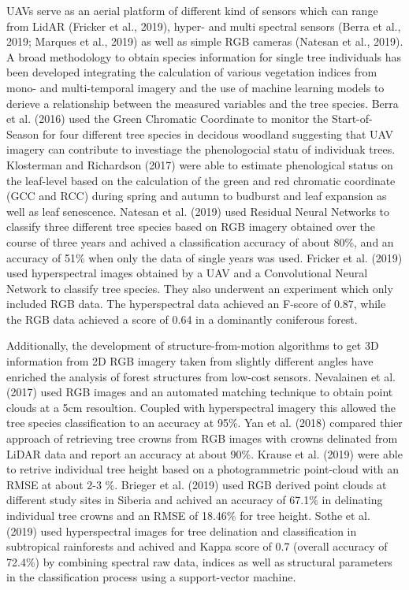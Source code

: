 \documentclass[]{article}
\begin{document}
UAVs serve as an aerial platform of different kind of sensors which can
range from LidAR (Fricker et al., 2019), hyper- and multi spectral
sensors (Berra et al., 2019; Marques et al., 2019) as well as simple RGB
cameras (Natesan et al., 2019). A broad methodology to obtain species
information for single tree individuals has been developed integrating
the calculation of various vegetation indices from mono- and
multi-temporal imagery and the use of machine learning models to derieve
a relationship between the measured variables and the tree species.
Berra et al. (2016) used the Green Chromatic Coordinate to monitor the
Start-of-Season for four different tree species in decidous woodland
suggesting that UAV imagery can contribute to investiage the
phenologocial statu of individuak trees. Klosterman and Richardson
(2017) were able to estimate phenological status on the leaf-level based
on the calculation of the green and red chromatic coordinate (GCC and
RCC) during spring and autumn to budburst and leaf expansion as well as
leaf senescence. Natesan et al. (2019) used Residual Neural Networks to
classify three different tree species based on RGB imagery obtained over
the course of three years and achived a classification accuracy of about
80\%, and an accuracy of 51\% when only the data of single years was
used. Fricker et al. (2019) used hyperspectral images obtained by a UAV
and a Convolutional Neural Network to classify tree species. They also
underwent an experiment which only included RGB data. The hyperspectral
data achieved an F-score of 0.87, while the RGB data achieved a score of
0.64 in a dominantly coniferous forest.

Additionally, the development of structure-from-motion algorithms to get
3D information from 2D RGB imagery taken from slightly different angles
have enriched the analysis of forest structures from low-cost sensors.
Nevalainen et al. (2017) used RGB images and an automated matching
technique to obtain point clouds at a 5cm resoultion. Coupled with
hyperspectral imagery this allowed the tree species classification to an
accuracy at 95\%. Yan et al. (2018) compared thier approach of
retrieving tree crowns from RGB images with crowns delinated from LiDAR
data and report an accuracy at about 90\%. Krause et al. (2019) were
able to retrive individual tree height based on a photogrammetric
point-cloud with an RMSE at about 2-3 \%. Brieger et al. (2019) used RGB
derived point clouds at different study sites in Siberia and achived an
accuracy of 67.1\% in delinating individual tree crowns and an RMSE of
18.46\% for tree height. Sothe et al. (2019) used hyperspectral images
for tree delination and classification in subtropical rainforests and
achived and Kappa score of 0.7 (overall accuracy of 72.4\%) by combining
spectral raw data, indices as well as structural parameters in the
classification process using a support-vector machine.
\end{document}
